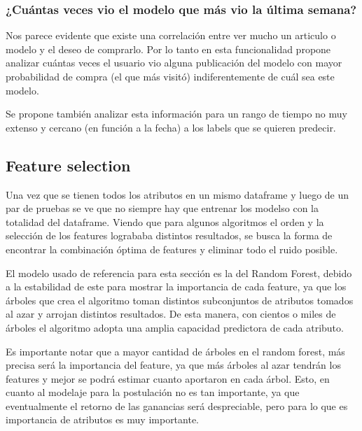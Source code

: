 \documentclass[a4paper]{article}
\begin{document}
\subsubsection{¿Cuántas veces vio el modelo que más vio la última semana?}

\begin{sloppypar}
	\texttt{}
\end{sloppypar}

Nos parece evidente que existe una correlación entre ver mucho un articulo o modelo y el deseo de comprarlo. Por lo tanto en esta funcionalidad propone analizar cuántas veces el usuario vio alguna publicación del modelo con mayor probabilidad de compra (el que más visitó) indiferentemente de cuál sea este modelo. 

Se propone también analizar esta información para un rango de tiempo no muy extenso y cercano (en función a la fecha) a los labels que se quieren predecir. 


\subsection{Feature selection}

Una vez que se tienen todos los atributos en un mismo dataframe y luego de un par de pruebas se ve que no siempre hay que entrenar los modelso con la totalidad del dataframe. Viendo que para algunos algoritmos el orden y la selección de los features logrababa distintos resultados, se busca la forma de encontrar la combinación óptima de features y eliminar todo el ruido posible.

El modelo usado de referencia para esta sección es la del Random Forest, debido a la estabilidad de este para mostrar la importancia de cada feature, ya que los árboles que crea el algoritmo toman distintos subconjuntos de atributos tomados al azar y arrojan distintos resultados. De esta manera, con cientos o miles de árboles el algoritmo adopta una amplia capacidad predictora de cada atributo.

Es importante notar que a mayor cantidad de árboles en el random forest, más precisa será la importancia del feature, ya que más árboles al azar tendrán los features y mejor se podrá estimar cuanto aportaron en cada árbol. Esto, en cuanto al modelaje para la postulación no es tan importante, ya que eventualmente el retorno de las ganancias será despreciable, pero para lo que es importancia de atributos es muy importante.
\end{document}
